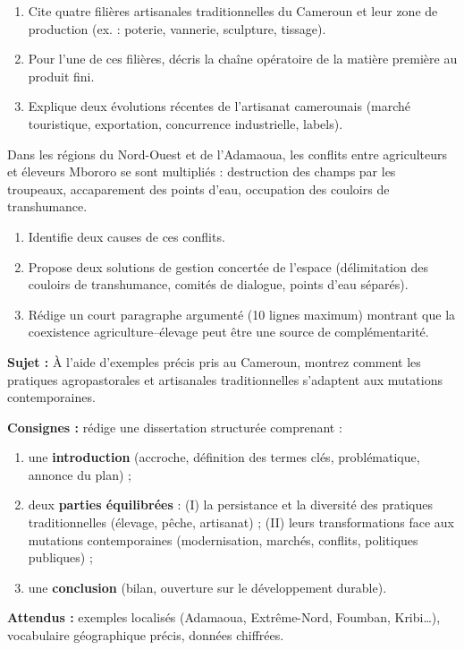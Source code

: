 \documentclass[11pt]{article}
\newcommand{\cle}[1]{{\popxbold\color{popdark}#1}}
\newcounter{popsec}
\newcounter{popsub}
\newcommand{\courssub}[1]{%
  \stepcounter{popsub}%
  \par\vspace{9pt}\noindent{\popxbold\fontsize{11.5}{13}\selectfont\color{popink}{\color{poporange}\thepopsec.\thepopsub}\hspace{6pt}#1}\par\nopagebreak\vspace{4pt}
}
\begin{document}
\begin{exercice}
\begin{enumerate}
\item Cite quatre filières artisanales traditionnelles du Cameroun et leur zone de production (ex. : poterie, vannerie, sculpture, tissage).
\item Pour l'une de ces filières, décris la \cle{chaîne opératoire} de la matière première au produit fini.
\item Explique deux évolutions récentes de l'artisanat camerounais (marché touristique, exportation, concurrence industrielle, labels).
\end{enumerate}
\end{exercice}

\begin{exercice}
Dans les régions du Nord-Ouest et de l'Adamaoua, les conflits entre agriculteurs et éleveurs Mbororo se sont multipliés : destruction des champs par les troupeaux, accaparement des points d'eau, occupation des couloirs de transhumance.
\begin{enumerate}
\item Identifie deux causes de ces conflits.
\item Propose deux solutions de gestion concertée de l'espace (délimitation des couloirs de transhumance, comités de dialogue, points d'eau séparés).
\item Rédige un court paragraphe argumenté (10 lignes maximum) montrant que la coexistence agriculture--élevage peut être une source de complémentarité.
\end{enumerate}
\end{exercice}

\courssub{Je me prépare au Bac}

\begin{exercice}
\textbf{Sujet :} À l'aide d'exemples précis pris au Cameroun, montrez comment les pratiques agropastorales et artisanales traditionnelles s'adaptent aux mutations contemporaines.

\textbf{Consignes :} rédige une dissertation structurée comprenant :
\begin{enumerate}
\item une \textbf{introduction} (accroche, définition des termes clés, problématique, annonce du plan) ;
\item deux \textbf{parties équilibrées} : (I) la persistance et la diversité des pratiques traditionnelles (élevage, pêche, artisanat) ; (II) leurs transformations face aux mutations contemporaines (modernisation, marchés, conflits, politiques publiques) ;
\item une \textbf{conclusion} (bilan, ouverture sur le développement durable).
\end{enumerate}
\textbf{Attendus :} exemples localisés (Adamaoua, Extrême-Nord, Foumban, Kribi\ldots), vocabulaire géographique précis, données chiffrées.
\end{exercice}
\end{document}
